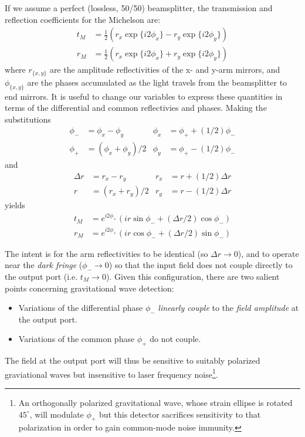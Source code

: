 If we assume a perfect (lossless, 50/50) beamsplitter, the
transmission and reflection coefficients for the Michelson are:
%
\begin{align}
t_M  &= \frac{1}{2}\left(r_x \exp \{i2\phi_x\} - r_y \exp\{i2\phi_y\} \right) \\
r_M  &= \frac{1}{2}\left(r_x \exp \{i2\phi_x\} + r_y \exp\{i2\phi_y\} \right)
\end{align}
where $r_{\{x,y\}}$ are the amplitude reflectivities of the x- and y-arm mirrors, and $\phi_{\{x,y\}}$ are 
the phases accumulated as the light travels from the beamsplitter to end mirrors.  It is useful to change
our variables to express these quantities in terms of the differential and common reflectivies and phases.
Making the substitutions
\begin{align}
\phi_- &= \phi_x - \phi_y       &  \phi_x &= \phi_+ + (1/2)\phi_- \\
\phi_+ &= (\phi_x + \phi_y)/2   &  \phi_y &= \phi_+ - (1/2)\phi_-
\end{align}
and
\begin{align}
  \Delta r & = r_x - r_y        &  r_x   &= r + (1/2)\Delta r \\
       r & = (r_x + r_y)/2      &  r_y   &= r - (1/2)\Delta r
\end{align}
yields
\begin{align}
t_M  &= e^{i2\phi_+} \left( i r\sin \phi_- + (\Delta r/2) \cos \phi_- \right) 
\label{eq:michelson-transmission}\\
r_M  &= e^{i2\phi_+} \left( i r \cos \phi_- + (\Delta r/2) \sin \phi_- \right) 
\end{align}

The intent is for the arm reflectivities to be identical (so $\Delta r \to
0$), and to operate near the \emph{dark fringe} ($\phi_-\to0$) so that
the input field does not couple directly to the output port
(i.e. $t_M\to0$).  Given this configuration, there are two salient
points concerning gravitational wave detection:
%
\begin{itemize}
\item Variations of the differential phase $\phi_-$ \emph{linearly couple} to the \emph{field amplitude} at the output port.
\item Variations of the common phase $\phi_+$ do not couple.
\end{itemize}
%
The field at the output port will thus be sensitive to suitably
polarized graviational waves but insensitive to laser frequency noise\footnote{An orthogonally polarized gravitational wave, whose strain ellipse is
rotated $45^\circ$, will modulate $\phi_+$ but this detector
sacrifices sensitivity to that polarization in order to gain
common-mode noise immunity.}. 

